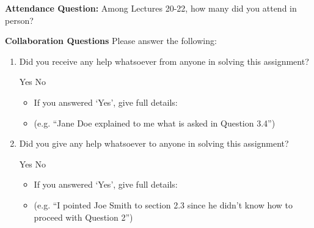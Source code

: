 \textbf{Attendance Question:} Among Lectures 20-22, how many did you attend in person?

\begin{tcolorbox}[fit,height=1cm,blank, borderline={1pt}{-2pt},nobeforeafter]
\end{tcolorbox}



\textbf{Collaboration Questions} Please answer the following:

\begin{enumerate}
    \item Did you receive any help whatsoever from anyone in solving this assignment?
          \begin{checkboxes}
              \choice Yes
              \choice No
          \end{checkboxes}
          \begin{itemize}
              \item If you answered `Yes', give full details:
              \item (e.g. “Jane Doe explained to me what is asked in Question 3.4”)
          \end{itemize}

          \begin{tcolorbox}[fit,height=3cm,blank, borderline={1pt}{-2pt},nobeforeafter]
          \end{tcolorbox}

    \item Did you give any help whatsoever to anyone in solving this assignment?
          \begin{checkboxes}
              \choice Yes
              \choice No
          \end{checkboxes}
          \begin{itemize}
              \item If you answered `Yes', give full details:
              \item (e.g. “I pointed Joe Smith to section 2.3 since he didn’t know how to proceed with Question 2”)
          \end{itemize}

          \begin{tcolorbox}[fit,height=3cm,blank, borderline={1pt}{-2pt},nobeforeafter]
          \end{tcolorbox}


\end{enumerate}
